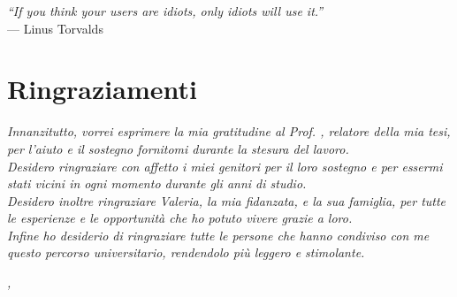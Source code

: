 \cleardoublepage
{}
{}

\begin{flushright}{
        \slshape
        ``If you think your users are idiots, only idiots will use it.''} \\
    \medskip
    --- Linus Torvalds
\end{flushright}


\bigskip

\begingroup
\let\clearpage\relax
\let\cleardoublepage\relax
\let\cleardoublepage\relax

\chapter*{Ringraziamenti}

\noindent \textit{Innanzitutto, vorrei esprimere la mia gratitudine al Prof. \myProf, relatore della mia tesi, per l'aiuto e il sostegno fornitomi durante la stesura del lavoro.}\\

\noindent \textit{Desidero ringraziare con affetto i miei genitori per il loro
    sostegno e per essermi stati vicini in ogni momento durante gli anni di
    studio.}\\

\noindent \textit{Desidero inoltre ringraziare Valeria, la mia fidanzata, e la
    sua famiglia, per tutte le esperienze e le opportunità che ho potuto vivere
    grazie a loro.}\\

\noindent \textit{Infine ho desiderio di ringraziare tutte le persone che hanno
    condiviso con me questo percorso universitario, rendendolo più leggero e stimolante.}\\
\bigskip

\noindent\textit{\myLocation, \myTime}
\hfill \myName

\endgroup
